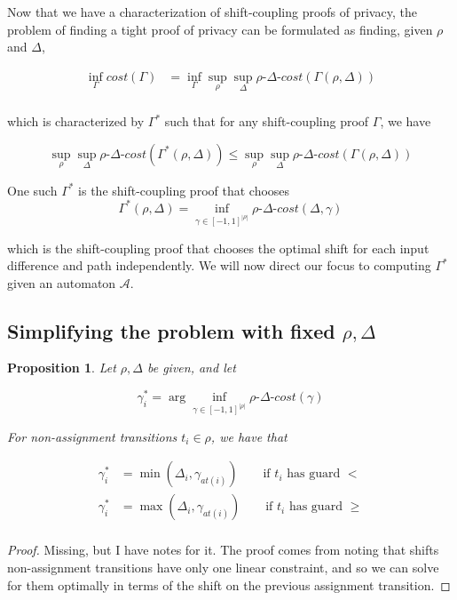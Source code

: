 \documentclass{article}
\newtheorem{proposition}{Proposition}[section]
\newcommand{\1}{\langle 1 \rangle}
\newcommand{\2}{\langle 2 \rangle}
\begin{document}
Now that we have a characterization of shift-coupling proofs of privacy, the problem of finding a tight proof of privacy can be formulated as finding, given $\rho$ and $\Delta$,

\begin{align*}
    \inf_{\Gamma} cost(\Gamma) &= \inf_{\Gamma} \sup_{\rho} \sup_{\Delta} \rho\text{-}\Delta\text{-}cost(\Gamma(\rho, \Delta)) \\
\end{align*}

which is characterized by $\Gamma^*$ such that for any shift-coupling proof $\Gamma$, we have

\[\sup_{\rho} \sup_{\Delta} \rho\text{-}\Delta\text{-}cost(\Gamma^*(\rho, \Delta)) \leq \sup_{\rho} \sup_{\Delta} \rho\text{-}\Delta\text{-}cost(\Gamma(\rho, \Delta))\]


One such $\Gamma^*$ is the shift-coupling proof that chooses \[\Gamma^*(\rho, \Delta) = \inf_{\gamma \in [-1, 1]^{|\rho|}} \rho\text{-}\Delta\text{-}cost(\Delta, \gamma)\]

which is the shift-coupling proof that chooses the optimal shift for each input difference and path independently. We will now direct our focus to computing $\Gamma^*$ given an automaton $\mathcal{A}$.

\subsection{Simplifying the problem with fixed $\rho, \Delta$}

\begin{proposition}
    \label{prop:gammas_non_assignment}
    Let $\rho, \Delta$ be given, and let 
    
    \[\gamma_i^* = \arg \inf_{\gamma \in [-1, 1]^{|\rho|}} \rho\text{-}\Delta\text{-}cost (\gamma)\]
    
    For non-assignment transitions $t_i \in \rho$, we have that 

    \begin{align*}
        \gamma_i^* &= \min(\Delta_i, \gamma_{at(i)}) \qquad \text{if } t_i \text{ has guard } < \\
        \gamma_i^* &= \max(\Delta_i, \gamma_{at(i)}) \qquad \text{if } t_i \text{ has guard } \geq \\
    \end{align*}
\end{proposition}

\begin{proof}
    Missing, but I have notes for it. The proof comes from noting that shifts non-assignment transitions have only one linear constraint, and so we can solve for them optimally in terms of the shift on the previous assignment transition. 
\end{proof}
\end{document}
